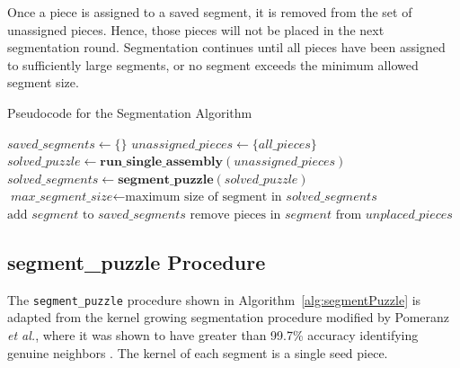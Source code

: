 Once a piece is assigned to a saved segment, it is removed from the set of unassigned pieces.  Hence, those pieces will not be placed in the next segmentation round.  Segmentation continues until all pieces have been assigned to sufficiently large segments, or no segment exceeds the minimum allowed segment size.

\begin{algorithm}
\caption{Pseudocode for the Segmentation Algorithm}\label{alg:segmentation}
\begin{algorithmic}[1]
    \State $\textit{saved\_segments} \gets \{ \}$
    \State $\textit{unassigned\_pieces} \gets \{ \textit{all\_pieces} \}$
    \Do
        \State $\textit{solved\_puzzle} \gets \textbf{run\_single\_assembly}(\textit{unassigned\_pieces})$
        \State $\textit{solved\_segments} \gets \textbf{segment\_puzzle}(\textit{solved\_puzzle})$
        \State $\textit{max\_segment\_size} \gets \text{maximum size of segment in } \textit{solved\_segments}$
                \State $\text{add } \textit{segment} \text{ to } \textit{saved\_segments}$
                \State $\text{remove pieces in } \textit{segment} \text{ from } \textit{unplaced\_pieces}$
            \EndIf
        \EndFor
\EndProcedure
\end{algorithmic}
\end{algorithm}

\subsection{{segment\_puzzle} Procedure}\label{sec:segmentPuzzle}

The \texttt{segment\_puzzle} procedure shown in Algorithm~\ref{alg:segmentPuzzle} is adapted from the kernel growing segmentation procedure modified by Pomeranz \textit{et al.}, where it was shown to have greater than 99.7\% accuracy identifying genuine neighbors \cite{pomeranz2011}. The kernel of each segment is a single seed piece.

